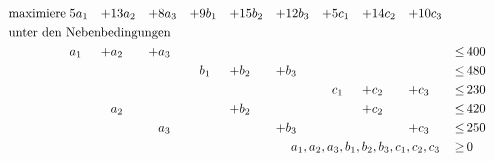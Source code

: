 \documentclass[10pt,a4paper,oneside,ngerman,numbers=noenddot]{scrartcl}
\begin{document}
	\subsection{} %
		\begin{alignat*}{10}
		\text{maximiere}\; & 5a_{1} &+& 13a_{2} &+& 8a_{3} &+& 9b_{1} &+& 15b_{2} &+& 12b_{3} &+& 5c_{1} &+& 14c_{2} &+& 10c_{3} &&  \\
		\multicolumn{20}{l}{\text{unter den Nebenbedingungen}} && \\
		& a_{1} &+& a_{2} &+& a_{3} && && && && && && &\leq &\, 400 \\
		& && && && b_{1} &+& b_{2} &+& b_{3} && && && &\leq &\, 480 \\
		& && && && && && && c_{1} &+& c_{2} &+& c_{3} &\leq &\, 230 	\\
		& && a_{2} && && &+& b_{2} && && &+& c_{2} && &\leq &\, 420 \\
		& && && a_{3} && && &+& b_{3} && && &+& c_{3} &\leq &\, 250 \\
		\multicolumn{18}{r}{$a_{1}, a_{2}, a_{3}, b_{1}, b_{2}, b_{3}, c_{1}, c_{2}, c_{3}$} \,&\geq &\, 0
		\end{alignat*}
\end{document}
